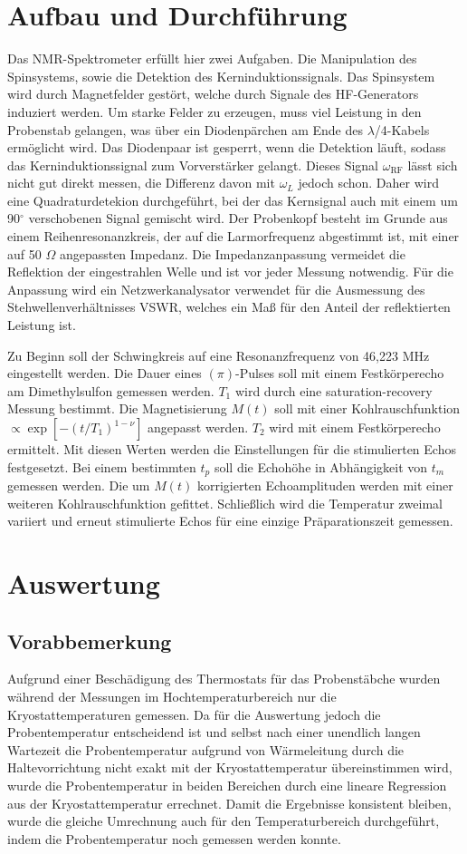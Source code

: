 \section{Aufbau und Durchführung}
Das NMR-Spektrometer erfüllt hier zwei Aufgaben. Die Manipulation des Spinsystems, sowie die Detektion des Kerninduktionssignals. Das Spinsystem wird durch
Magnetfelder gestört, welche durch Signale des HF-Generators induziert werden. Um starke Felder zu erzeugen, muss viel Leistung in den Probenstab gelangen,
was über ein Diodenpärchen am Ende des $\lambda$/4-Kabels ermöglicht wird. Das Diodenpaar ist gesperrt, wenn die Detektion läuft, sodass das Kerninduktionssignal
zum Vorverstärker gelangt. Dieses Signal $\omega_\text{RF}$ lässt sich nicht gut direkt messen, die Differenz davon mit $\omega_L$ jedoch schon. Daher wird
eine Quadraturdetekion durchgeführt, bei der das Kernsignal auch mit einem um 90$^\circ$ verschobenen Signal gemischt wird. Der Probenkopf besteht im Grunde
aus einem Reihenresonanzkreis, der auf die Larmorfrequenz abgestimmt ist, mit einer auf 50 $\Omega$ angepassten Impedanz. Die Impedanzanpassung vermeidet die 
Reflektion der eingestrahlen Welle und ist vor jeder Messung notwendig. Für die Anpassung wird ein Netzwerkanalysator verwendet für die Ausmessung des
Stehwellenverhältnisses VSWR, welches ein Maß für den Anteil der reflektierten Leistung ist.

\noindent Zu Beginn soll der Schwingkreis auf eine Resonanzfrequenz von 46,223 MHz eingestellt werden. Die Dauer eines $(\pi)$-Pulses soll mit einem 
Festkörperecho am Dimethylsulfon gemessen werden. $T_1$ wird durch eine saturation-recovery Messung bestimmt. Die Magnetisierung $M(t)$ soll mit einer
Kohlrauschfunktion $\propto \exp[-(t/T_1)^{1-\nu}]$ angepasst werden. $T_2$ wird mit einem Festkörperecho ermittelt. Mit diesen Werten werden die Einstellungen
für die stimulierten Echos festgesetzt. Bei einem bestimmten $t_p$ soll die Echohöhe in Abhängigkeit von $t_m$ gemessen werden. Die um $M(t)$ korrigierten
Echoamplituden werden mit einer weiteren Kohlrauschfunktion gefittet. Schließlich wird die Temperatur zweimal variiert und erneut stimulierte Echos für eine einzige
Präparationszeit gemessen.

\section{Auswertung}
\subsection{Vorabbemerkung}
Aufgrund einer Beschädigung des Thermostats für das Probenstäbche wurden während der Messungen im Hochtemperaturbereich nur die Kryostattemperaturen gemessen. Da für die Auswertung jedoch die Probentemperatur entscheidend ist und selbst nach einer unendlich langen Wartezeit die Probentemperatur aufgrund von Wärmeleitung durch die Haltevorrichtung nicht exakt mit der Kryostattemperatur übereinstimmen wird, wurde die Probentemperatur in beiden Bereichen durch eine lineare Regression aus der Kryostattemperatur errechnet. Damit die Ergebnisse konsistent bleiben, wurde die gleiche Umrechnung auch für den Temperaturbereich durchgeführt, indem die Probentemperatur noch gemessen werden konnte.
